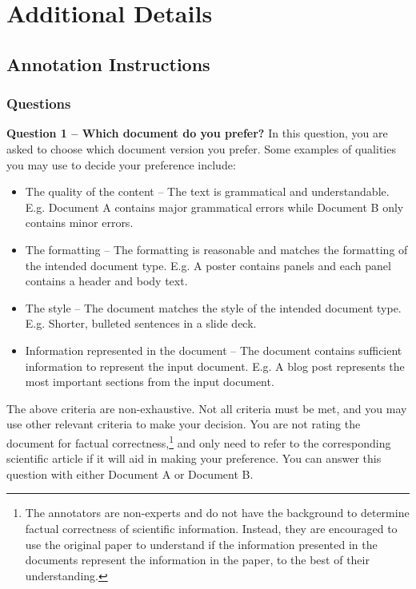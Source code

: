 \appendix 
\makeatletter
{}
\makeatother
\renewcommand{\thechapter}{\Alph{chapter}}

\chapter{Additional Details} \label{appendix}

\section{Annotation Instructions}
\label{sec:annotation-instructions}
\subsection{Questions}
\textbf{Question 1 – Which document do you prefer?}
In this question, you are asked to choose which document version you prefer. Some examples of qualities you may use to decide your preference include: 
\begin{itemize}
    \item The quality of the content – The text is grammatical and understandable. E.g. Document A contains major grammatical errors while Document B only contains minor errors.
    \item The formatting – The formatting is reasonable and matches the formatting of the intended document type. E.g. A poster contains panels and each panel contains a header and body text.
    \item The style – The document matches the style of the intended document type. E.g. Shorter, bulleted sentences in a slide deck.
    \item Information represented in the document – The document contains sufficient information to represent the input document. E.g. A blog post represents the most important sections from the input document.
\end{itemize}


The above criteria are non-exhaustive. Not all criteria must be met, and you may use other relevant criteria to make your decision. 
You are not rating the document for factual correctness,\footnote{The annotators are non-experts and do not have the background to determine factual correctness of scientific information. Instead, they are encouraged to use the original paper to understand if the information presented in the documents represent the information in the paper, to the best of their understanding.} and only need to refer to the corresponding scientific article if it will aid in making your preference. 
You can answer this question with either Document A or Document B.


